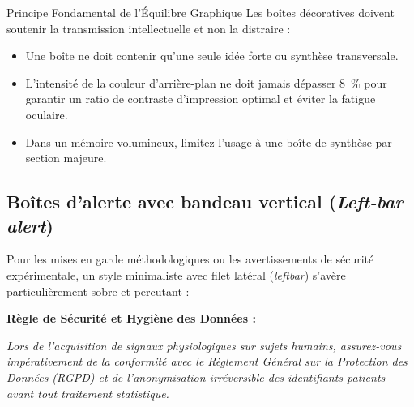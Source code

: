 \begin{boiteSynthese}{Principe Fondamental de l'Équilibre Graphique}
  Les boîtes décoratives doivent soutenir la transmission intellectuelle et non la distraire :
  \begin{itemize}
    \item Une boîte ne doit contenir qu'une seule idée forte ou synthèse transversale.
    \item L'intensité de la couleur d'arrière-plan ne doit jamais dépasser \qty{8}{\percent} pour garantir un ratio de contraste d'impression optimal et éviter la fatigue oculaire.
    \item Dans un mémoire volumineux, limitez l'usage à une boîte de synthèse par section majeure.
  \end{itemize}
\end{boiteSynthese}

\subsection{Boîtes d'alerte avec bandeau vertical (\emph{Left-bar alert})}
\label{subsec:boite_alerte}

Pour les mises en garde méthodologiques ou les avertissements de sécurité expérimentale, un style minimaliste avec filet latéral (\emph{leftbar}) s'avère particulièrement sobre et percutant :

\begin{tcolorbox}[
  enhanced,
  blanker,
  borderline west={3pt}{0pt}{Bittersweet},
  left=12pt,
  top=4pt,
  bottom=4pt
]
  \textcolor{Bittersweet}{\bfseries\sffamily Règle de Sécurité et Hygiène des Données :}\par
  \small\itshape Lors de l'acquisition de signaux physiologiques sur sujets humains, assurez-vous impérativement de la conformité avec le Règlement Général sur la Protection des Données (RGPD) et de l'anonymisation irréversible des identifiants patients avant tout traitement statistique.
\end{tcolorbox}

